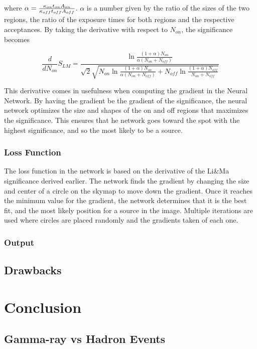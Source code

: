 \documentclass[12pt]{article}
\begin{document}
where $\alpha = \frac{\kappa_{on} \* t_{on} \* A_{on}}{\kappa_{off} \* t_{off} \* A_{off}} $. $\alpha$ is a number given by the ratio of the sizes of the two regions, the ratio of the exposure times for both regions and the respective acceptances.\cite{2005A&A...430..355G} By taking the derivative with respect to $N_{on}$, the significance becomes

$$\frac{d}{dN_{on}} S_{LM} = \frac{\ln{\frac{(1+\alpha)N_{on}}{\alpha(N_{on} + N_{off})}}}{\sqrt{2}\sqrt{N_{on}\ln{\frac{(1+\alpha)N_{on}}{\alpha(N_{on}+N_{off})}} + N_{off}\ln{\frac{(1+\alpha)N_{off}}{N_{on}+N_{off}}}}} $$

This derivative comes in usefulness when computing the gradient in the Neural Network. By having the gradient be the gradient of the significance, the neural network optimizes the size and shapes of the on and off regions that maximizes the significance. This ensures that he network goes toward the spot with the highest significance, and so the most likely to be a source. 


\subsubsection{Loss Function}

The loss function in the network is based on the derivative of the Li\&Ma significance derived earlier. The network finds the gradient by changing the size and center of a circle on the skymap to move down the gradient. Once it reaches the minimum value for the gradient, the network determines that it is the best fit, and the most likely position for a source in the image. Multiple iterations are used where circles are placed randomly and the gradients taken of each one. 


\subsubsection{Output}
\subsection{Drawbacks}


\section{Conclusion}

\newpage
\subsection{Gamma-ray vs Hadron Events}\label{sec:gammaVhadron}
\end{document}
